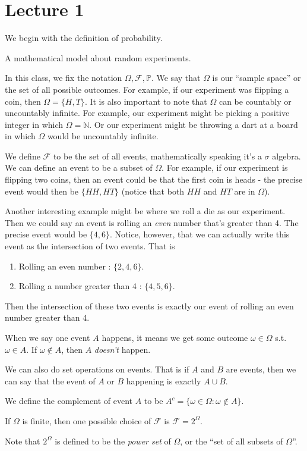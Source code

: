 \documentclass[notitlepage,abstract=on,twoside=semi]{scrartcl}
\newcommand{\N}{\ensuremath{\mathbb{N}}}
\newcommand{\om}{\ensuremath{\Omega}}
\newcommand{\F}{\ensuremath{\mathcal{F}}}
\newcommand{\Prob}{\ensuremath{\mathbb{P}}}
\begin{document}
\section{Lecture 1}
\label{lec1}
We begin with the definition of probability.
\begin{definition}
  \label{1:1}
  A mathematical model about random experiments.
\end{definition}
In this class, we fix the notation $\om, \F, \Prob$. We say that $\om$ is our
``sample space'' or the set of all possible outcomes. For example, if our
experiment was flipping a coin, then $\om = \{H, T\}$. It is also important to
note that $\om$ can be countably or uncountably infinite. For example, our
experiment might be picking a positive integer in which $\om = \N$. Or our
experiment might be throwing a dart at a board in which $\om$ would be
uncountably infinite.

We define $\F$ to be the set of all events, mathematically speaking it's a
$\sigma$ algebra. We can define an event to be a subset of $\om$. For example,
if our experiment is flipping two coins, then an event could be that the first
coin is heads - the precise event would then be $\{HH, HT\}$ (notice that both
$HH$ and $HT$ are in $\om$).

Another interesting example might be where we roll a die as our
experiment. Then we could say an event is rolling an \textit{even} number
that's greater than 4. The precise event would be $\{4, 6\}$. Notice, however,
that we can actually write this event as the intersection of two events. That
is
\begin{enumerate}
\item Rolling an even number : $\{2,4,6\}$.
\item Rolling a number greater than 4 : $\{4,5,6\}$.
\end{enumerate}
Then the intersection of these two events is exactly our event of rolling an
even number greater than 4.
\begin{remark}
  \label{1:2}
  When we say one event $A$ happens, it means we get some outcome $\omega \in
  \om$ s.t. $\omega \in A$. If $\omega \not \in A$, then $A$ \textit{doesn't}
  happen.
\end{remark}
\begin{remark}
  \label{1:3}
  We can also do set operations on events. That is if $A$ and $B$ are events,
  then we can say that the event of $A$ or $B$ happening is exactly $A \cup B$.
\end{remark}
\begin{definition}
  \label{1:4}
  We define the complement of event $A$ to be $A^{c} = \{\omega \in \om :
  \omega \not \in A\}$.
\end{definition}
\begin{remark}
  \label{1:5}
  If $\om$ is finite, then one possible choice of $\F$ is $\F = 2^{\om}$.
\end{remark}
Note that $2^{\om}$ is defined to be the \textit{power set} of $\om$, or the
``set of all subsets of $\om$''.
\end{document}
